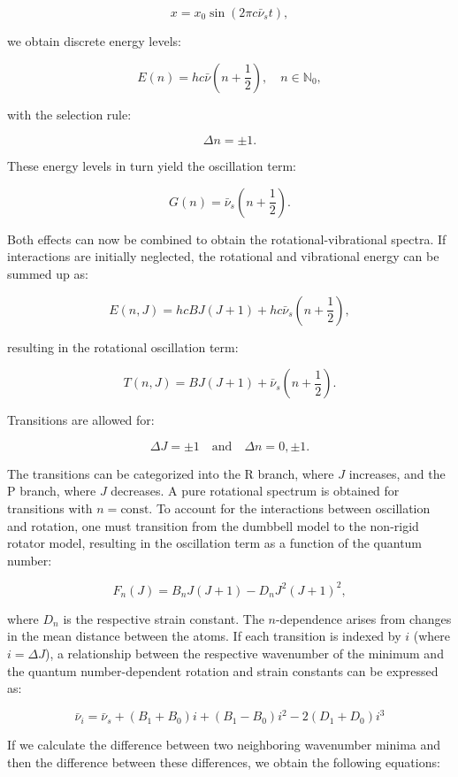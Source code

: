 \documentclass{article}
\begin{document}
\[
x = x_0 \sin (2\pi c \bar{\nu}_s t),
\]

we obtain discrete energy levels:

\[
E(n) = hc \bar{\nu} \left( n + \frac{1}{2} \right), \quad n \in \mathbb{N}_0,
\]

with the selection rule:

\[
\Delta n = \pm 1.
\]

\pagebreak{}

These energy levels in turn yield the oscillation term:

\[
G(n) = \bar{\nu}_s \left( n + \frac{1}{2} \right).
\]

Both effects can now be combined to obtain the rotational-vibrational spectra. If interactions are initially neglected, the rotational and vibrational energy can be summed up as:

\[
E(n, J) = hcBJ(J + 1) + hc\bar{\nu}_s \left( n + \frac{1}{2} \right),
\]

resulting in the rotational oscillation term:

\[
T(n, J) = BJ(J + 1) + \bar{\nu}_s \left( n + \frac{1}{2} \right).
\]

Transitions are allowed for:

\[
\Delta J = \pm 1 \quad \text{and} \quad \Delta n = 0, \pm 1.
\]

The transitions can be categorized into the R branch, where \(J\) increases, and the P branch, where \(J\) decreases. A pure rotational spectrum is obtained for transitions with \(n = \text{const}\). To account for the interactions between oscillation and rotation, one must transition from the dumbbell model to the non-rigid rotator model, resulting in the oscillation term as a function of the quantum number:

\[
F_n(J) = B_n J(J + 1) - D_n J^2 (J + 1)^2,
\]

where \(D_n\) is the respective strain constant. The \(n\)-dependence arises from changes in the mean distance between the atoms. If each transition is indexed by \(i\) (where \(i = \Delta J\)), a relationship between the respective wavenumber of the minimum and the quantum number-dependent rotation and strain constants can be expressed as:

\begin{equation}
	\bar{\nu}_i = \bar{\nu}_s + (B_1 + B_0)i + (B_1 - B_0)i^2 - 2(D_1 + D_0)i^3
	\label{eq:Wavenumber}
\end{equation}


If we calculate the difference between two neighboring wavenumber minima and then the difference between these differences, we obtain the following equations:
\end{document}
